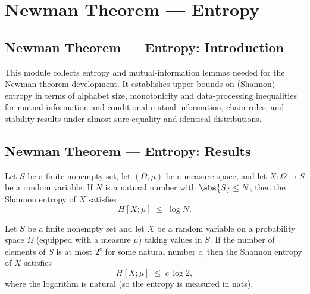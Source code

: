 \section{Newman Theorem --- Entropy}
\subsection*{Newman Theorem --- Entropy: Introduction}

This module collects entropy and mutual-information lemmas needed for the Newman theorem
development.  It establishes upper bounds on (Shannon) entropy in terms of alphabet size,
monotonicity and data-processing inequalities for mutual information and conditional mutual
information, chain rules, and stability results under almost-sure equality and identical
distributions.

\subsection*{Newman Theorem --- Entropy: Results}

\begin{theorem}
\label{ProbabilityTheory.entropy_le_log_of_card_le}
\leanok
{}
Let $S$ be a finite nonempty set, let $(\Omega,\mu)$ be a measure space, and let
$X\colon\Omega\to S$ be a random variable. If $N$ is a natural number with $\abs{S}\le
N$, then the Shannon entropy of $X$ satisfies
\[
  H[X;\mu]\;\le\;\log N.
\]
\end{theorem}

\begin{theorem}
\label{ProbabilityTheory.entropy_le_nat_mul_log_two_of_card_le_two_pow}
\leanok
{}
Let $S$ be a finite nonempty set and let $X$ be a random variable on a probability space
$\Omega$ (equipped with a measure $\mu$) taking values in $S$. If the number of elements
of $S$ is at most $2^c$ for some natural number $c$, then the Shannon entropy of $X$
satisfies
\[
  H[X;\mu] \;\le\; c\,\log 2,
\]
where the logarithm is natural (so the entropy is measured in nats).
\end{theorem}

